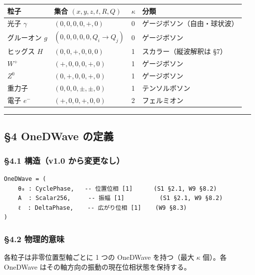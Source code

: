 \documentclass[a4paper,11pt]{ltjsarticle}
\newcounter{none}
\begin{document}
{\def\LTcaptype{none} %
\begin{longtable}[]{@{}llll@{}}
\toprule\noalign{}
粒子 & 集合 \((x,y,z,t,R,Q)\) & \(\kappa\) & 分類 \\
\midrule\noalign{}
\endhead
\bottomrule\noalign{}
\endlastfoot
光子 \(\gamma\) & \((0,0,0,0,+,0)\) & 0 &
ゲージボソン（自由・球状波） \\
グルーオン \(g\) & \((0,0,0,0,0,Q_i \to Q_j)\) & 0 & ゲージボソン \\
ヒッグス \(H\) & \((0,0,+,0,0,0)\) & 1 & スカラー（縦波解釈は §7） \\
\(W^+\) & \((+,0,0,0,+,0)\) & 1 & ゲージボソン \\
\(Z^0\) & \((0,+,0,0,+,0)\) & 1 & ゲージボソン \\
重力子 & \((0,0,0,\pm,\pm,0)\) & 1 & テンソルボソン \\
電子 \(e^-\) & \((+,0,0,+,0,0)\) & 2 & フェルミオン \\
\end{longtable}
}

\begin{center}\rule{0.5\linewidth}{0.5pt}\end{center}

\subsection{§4 OneDWave の定義}\label{onedwave-ux306eux5b9aux7fa9}

\subsubsection{§4.1 構造（v1.0
から変更なし）}\label{ux69cbux9020v1.0-ux304bux3089ux5909ux66f4ux306aux3057}

\begin{verbatim}
OneDWave = (
    θ₀ : CyclePhase,   -- 位置位相 [1]      (S1 §2.1, W9 §8.2)
    A  : Scalar256,     -- 振幅 [1]          (S1 §2.1, W9 §8.2)
    ℓ  : DeltaPhase,    -- 広がり位相 [1]    (W9 §8.3)
)
\end{verbatim}

\subsubsection{§4.2 物理的意味}\label{ux7269ux7406ux7684ux610fux5473-1}

各粒子は非零位置型軸ごとに 1 つの OneDWave を持つ（最大 \(\kappa\)
個）。各 OneDWave はその軸方向の振動の現在位相状態を保持する。
\end{document}
